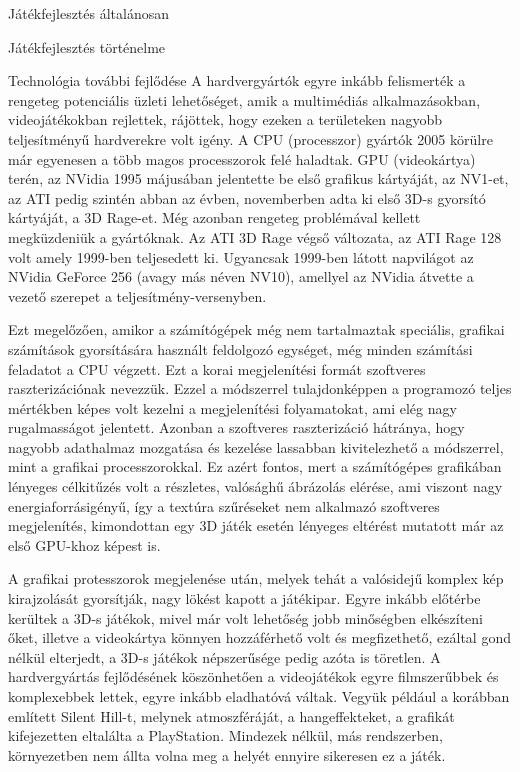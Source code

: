 \begin{MyChapter}{Játékfejlesztés általánosan}
\begin{MySection}{Játékfejlesztés történelme}
		\begin{MySubSection}{Technológia további fejlődése}
			A hardvergyártók egyre inkább felismerték a rengeteg potenciális üzleti lehetőséget, amik a multimédiás alkalmazásokban, videojátékokban rejlettek, rájöttek, hogy ezeken a területeken nagyobb teljesítményű hardverekre volt igény.
			A CPU (processzor) gyártók 2005 körülre már egyenesen a több magos processzorok felé haladtak. 
			GPU (videokártya) terén, az NVidia 1995 májusában jelentette be első grafikus kártyáját, az NV1-et, az ATI pedig szintén abban az évben, novemberben adta ki első 3D-s gyorsító kártyáját, a 3D Rage-et. Még azonban rengeteg problémával kellett megküzdeniük a gyártóknak. Az ATI 3D Rage végső változata, az ATI Rage 128 volt amely 1999-ben teljesedett ki. Ugyancsak 1999-ben látott napvilágot az NVidia GeForce 256 (avagy más néven NV10), amellyel az NVidia átvette a vezető szerepet a teljesítmény-versenyben.
			\cite{gpu_history}
			\cite{ati}
			\cite{nvidia}
		
			Ezt megelőzően, amikor a számítógépek még nem tartalmaztak speciális, grafikai számítások gyorsítására használt feldolgozó egységet, még minden számítási feladatot a CPU végzett. Ezt a korai megjelenítési formát szoftveres raszterizációnak nevezzük. Ezzel a módszerrel tulajdonképpen a programozó teljes mértékben képes volt kezelni a megjelenítési folyamatokat, ami elég nagy rugalmasságot jelentett.
			Azonban a szoftveres raszterizáció hátránya, hogy nagyobb adathalmaz mozgatása és kezelése lassabban kivitelezhető a módszerrel, mint a grafikai processzorokkal.
			Ez azért fontos, mert a számítógépes grafikában lényeges célkitűzés volt a részletes, valósághű ábrázolás elérése, ami viszont nagy energiaforrásigényű, így a textúra szűréseket nem alkalmazó szoftveres megjelenítés, kimondottan egy 3D játék esetén lényeges eltérést mutatott már az első GPU-khoz képest is. \cite{mileff}
		
			A grafikai protesszorok megjelenése után, melyek tehát a valósidejű komplex kép kirajzolását gyorsítják, nagy lökést kapott a játékipar. Egyre inkább előtérbe kerültek a 3D-s játékok, mivel már volt lehetőség jobb minőségben elkészíteni őket, illetve a videokártya könnyen hozzáférhető volt és megfizethető, ezáltal gond nélkül elterjedt, a 3D-s játékok népszerűsége pedig azóta is töretlen.
			A hardvergyártás fejlődésének köszönhetően a videojátékok egyre filmszerűbbek és komplexebbek lettek, egyre inkább eladhatóvá váltak. Vegyük például a korábban említett Silent Hill-t, melynek atmoszféráját, a hangeffekteket, a grafikát kifejezetten eltalálta a PlayStation. Mindezek nélkül, más rendszerben, környezetben nem állta volna meg a helyét ennyire sikeresen ez a játék.
		

\end{MySubSection}
\end{MySection}
\end{MyChapter}

